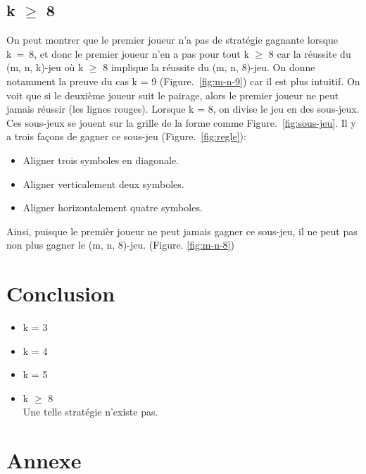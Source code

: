 \documentclass[12pt, a4paper]{article}
\begin{document}
\subsection{k $\ge$ 8}
On peut montrer que le premier joueur n'a pas de stratégie gagnante lorsque k~=~8, et donc le premier joueur n'en a pas pour tout k $\ge$ 8 car la réussite du (m, n, k)-jeu où k $\ge$ 8 implique la réussite du (m, n, 8)-jeu. On donne notamment la preuve du cas k = 9 \mbox{(Figure. \ref{fig:m-n-9})} car il est plus intuitif.
On voit que si le deuxième joueur suit le pairage, alors le premier joueur ne peut jamais réussir (les lignes rouges).\newpage
Lorsque k = 8, on divise le jeu en des sous-jeux. Ces sous-jeux se jouent sur la grille de la forme comme \mbox{Figure. \ref{fig:sous-jeu}.}
Il y a trois façons de gagner ce sous-jeu \mbox{(Figure. \ref{fig:regle}):}
\begin{itemize}
    \item Aligner trois symboles en diagonale.
    \item Aligner verticalement deux symboles.
    \item Aligner horizontalement quatre symboles.
\end{itemize}
Ainsi, puisque le premièr joueur ne peut jamais gagner ce sous-jeu, il ne peut pas non plus gagner le (m, n, 8)-jeu. (Figure. \ref{fig:m-n-8})
\section{Conclusion}

\begin{itemize}
    \item k = 3
    \item k = 4
    \item k = 5
    \item k $\ge$ 8\\
        Une telle stratégie n'existe pas.
\end{itemize}

\section{Annexe}
\end{document}
